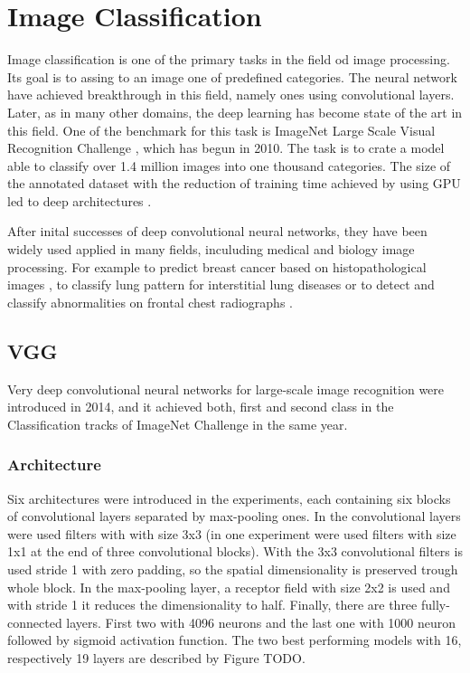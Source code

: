 \section{Image Classification}
Image classification is one of the primary tasks in the field od image processing.
Its goal is to assing to an image one of predefined categories.
The neural network have achieved breakthrough in this field, namely ones using
convolutional layers. Later, as in many other domains, the deep learning has 
become state of the art in this field. One of the benchmark for this task is ImageNet 
Large Scale Visual Recognition Challenge \cite{russakovsky2015imagenet}, which has begun in 2010.
The task is to crate a model able to classify over 1.4 million images into one thousand 
categories. The size of the annotated dataset with the reduction of training time achieved by using GPU led
to deep architectures \cite{AlexNet}.

After inital successes of deep convolutional neural networks, they have been widely used
applied in many fields, inculuding medical and biology image processing. For example to 
predict breast cancer based on histopathological images \cite{BreastCNN}, to classify
lung pattern for interstitial lung diseases \cite{LungCNN} or to detect and classify
abnormalities on frontal chest radiographs \cite{ChestCNN}.


\subsection{VGG}
Very deep convolutional neural networks for large-scale image recognition \cite{VGG} were 
introduced in 2014, and it achieved both, first and second class in the Classification tracks of 
ImageNet Challenge \cite{IN2014} in the same year.


\subsubsection{Architecture}
Six architectures were introduced in the experiments, each containing six blocks of convolutional
layers separated by max-pooling ones. In the convolutional layers were used filters with
with size 3x3 (in one experiment were used filters with size 1x1 at the end of three convolutional blocks).
With the 3x3 convolutional filters is used stride 1 with zero padding, so the spatial dimensionality
is preserved trough whole block. In the max-pooling layer, a receptor field with size 2x2 is used and with stride 1 it 
reduces the dimensionality to half. Finally, there are three fully-connected layers. First two with 4096 neurons and
the last one with 1000 neuron followed by sigmoid activation function. The two best performing models with 16, respectively 19
layers are described by Figure TODO.


